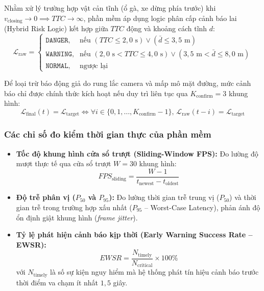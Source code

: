 Nhằm xử lý trường hợp vật cản tĩnh (ổ gà, xe dừng phía trước) khi $v_{\text{closing}} \to 0 \implies TTC \to \infty$, phần mềm áp dụng logic phân cấp cảnh báo lai (Hybrid Risk Logic) kết hợp giữa $TTC$ động và khoảng cách tĩnh $d$:
\begin{equation}
\label{eq:hybrid_risk}
\mathcal{L}_{\text{raw}} = \begin{cases}
\texttt{DANGER}, & \text{nếu } (TTC \le 2,0\text{ s}) \lor (\bar{d} \le 3,5\text{ m}) \\
\texttt{WARNING}, & \text{nếu } (2,0\text{ s} < TTC \le 4,0\text{ s}) \lor (3,5\text{ m} < \bar{d} \le 8,0\text{ m}) \\
\texttt{NORMAL}, & \text{ngược lại}
\end{cases}
\end{equation}

Để loại trừ báo động giả do rung lắc camera và mấp mô mặt đường, mức cảnh báo chỉ được chính thức kích hoạt nếu duy trì liên tục qua $K_{\text{confirm}} = 3$ khung hình:
\begin{equation}
\label{eq:confirm_frames}
\mathcal{L}_{\text{final}}(t) = \mathcal{L}_{\text{target}} \iff \forall i \in \{0, 1, \dots, K_{\text{confirm}} - 1\}, \, \mathcal{L}_{\text{raw}}(t - i) = \mathcal{L}_{\text{target}}
\end{equation}

\subsubsection{Các chỉ số đo kiểm thời gian thực của phần mềm}
\begin{itemize}
    \item \textbf{Tốc độ khung hình cửa sổ trượt (Sliding-Window FPS):} Đo lường độ mượt thực tế qua cửa sổ trượt $W = 30$ khung hình:
    \begin{equation}
    \label{eq:sliding_fps}
    FPS_{\text{sliding}} = \frac{W - 1}{t_{\text{newest}} - t_{\text{oldest}}}
    \end{equation}
    \item \textbf{Độ trễ phân vị ($P_{50}$ và $P_{95}$):} Đo lường thời gian trễ trung vị ($P_{50}$) và thời gian trễ trong trường hợp xấu nhất ($P_{95}$ -- Worst-Case Latency), phản ánh độ ổn định giật khung hình (\textit{frame jitter}).
    \item \textbf{Tỷ lệ phát hiện cảnh báo kịp thời (Early Warning Success Rate -- EWSR):}
    \begin{equation}
    \label{eq:ewsr_metric}
    EWSR = \frac{N_{\text{timely}}}{N_{\text{critical}}} \times 100\%
    \end{equation}
    với $N_{\text{timely}}$ là số sự kiện nguy hiểm mà hệ thống phát tín hiệu cảnh báo trước thời điểm va chạm ít nhất $1,5$ giây.
\end{itemize}


